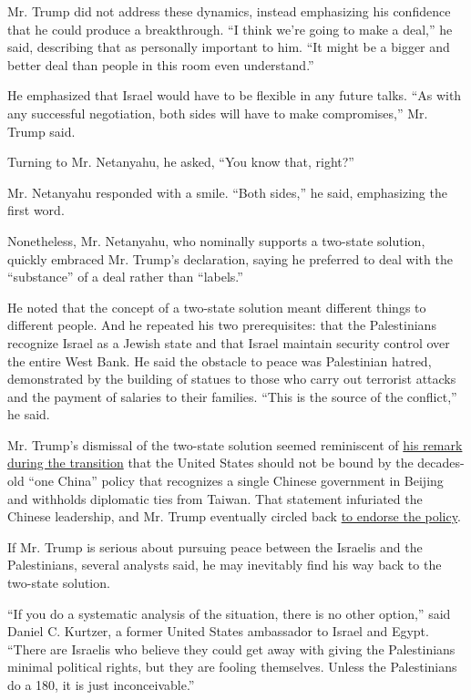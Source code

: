 Mr. Trump did not address these dynamics, instead emphasizing his
confidence that he could produce a breakthrough. ``I think we're going
to make a deal,'' he said, describing that as personally important to
him. ``It might be a bigger and better deal than people in this room
even understand.''

He emphasized that Israel would have to be flexible in any future talks.
``As with any successful negotiation, both sides will have to make
compromises,'' Mr. Trump said.

Turning to Mr. Netanyahu, he asked, ``You know that, right?''

Mr. Netanyahu responded with a smile. ``Both sides,'' he said,
emphasizing the first word.

Nonetheless, Mr. Netanyahu, who nominally supports a two-state solution,
quickly embraced Mr. Trump's declaration, saying he preferred to deal
with the ``substance'' of a deal rather than ``labels.''

He noted that the concept of a two-state solution meant different things
to different people. And he repeated his two prerequisites: that the
Palestinians recognize Israel as a Jewish state and that Israel maintain
security control over the entire West Bank. He said the obstacle to
peace was Palestinian hatred, demonstrated by the building of statues to
those who carry out terrorist attacks and the payment of salaries to
their families. ``This is the source of the conflict,'' he said.

Mr. Trump's dismissal of the two-state solution seemed reminiscent of
\href{https://www.nytimes.com/2016/12/11/us/politics/trump-taiwan-one-china.html}{his
remark during the transition} that the United States should not be bound
by the decades-old ``one China'' policy that recognizes a single Chinese
government in Beijing and withholds diplomatic ties from Taiwan. That
statement infuriated the Chinese leadership, and Mr. Trump eventually
circled back
\href{http://www.nytimes.com/2017/02/09/world/asia/donald-trump-china-xi-jinping-letter.html}{to
endorse the policy}.

If Mr. Trump is serious about pursuing peace between the Israelis and
the Palestinians, several analysts said, he may inevitably find his way
back to the two-state solution.

``If you do a systematic analysis of the situation, there is no other
option,'' said Daniel C. Kurtzer, a former United States ambassador to
Israel and Egypt. ``There are Israelis who believe they could get away
with giving the Palestinians minimal political rights, but they are
fooling themselves. Unless the Palestinians do a 180, it is just
inconceivable.''

